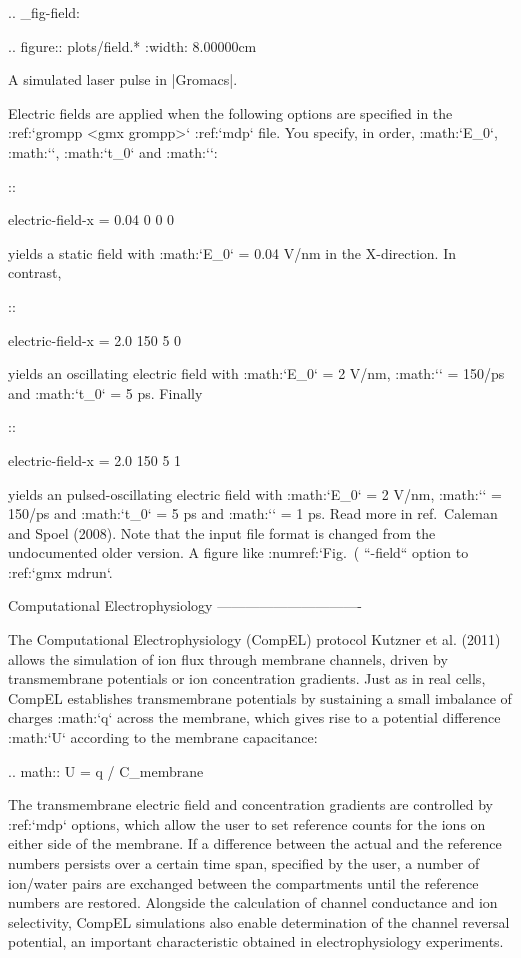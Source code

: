 .. _fig-field:

.. figure:: plots/field.*
   :width: 8.00000cm

   A simulated laser pulse in |Gromacs|.

Electric fields are applied when the following options are specified in
the :ref:`grompp <gmx grompp>` :ref:`mdp` file. You specify, in order, :math:`E_0`,
:math:`\omega`, :math:`t_0` and :math:`\sigma`:

::

    electric-field-x = 0.04 0       0     0

yields a static field with :math:`E_0` = 0.04 V/nm in the X-direction.
In contrast,

::

    electric-field-x = 2.0  150     5     0

yields an oscillating electric field with :math:`E_0` = 2 V/nm,
:math:`\omega` = 150/ps and :math:`t_0` = 5 ps. Finally

::

    electric-field-x = 2.0  150     5     1

yields an pulsed-oscillating electric field with :math:`E_0` = 2 V/nm,
:math:`\omega` = 150/ps and :math:`t_0` = 5 ps and :math:`\sigma` = 1
ps. Read more in ref. Caleman and Spoel (2008). Note that the input file
format is changed from the undocumented older version. A figure like
:numref:`Fig. (%
``-field`` option to :ref:`gmx mdrun`.

Computational Electrophysiology
-------------------------------

The Computational Electrophysiology (CompEL) protocol Kutzner et al.
(2011) allows the simulation of ion flux through membrane channels,
driven by transmembrane potentials or ion concentration gradients. Just
as in real cells, CompEL establishes transmembrane potentials by
sustaining a small imbalance of charges :math:`\Delta q` across the
membrane, which gives rise to a potential difference :math:`\Delta U`
according to the membrane capacitance:

.. math:: \Delta U = \Delta q / C_{membrane}

The transmembrane electric field and concentration gradients are
controlled by :ref:`mdp` options, which allow the user to set
reference counts for the ions on either side of the membrane. If a
difference between the actual and the reference numbers persists over a
certain time span, specified by the user, a number of ion/water pairs
are exchanged between the compartments until the reference numbers are
restored. Alongside the calculation of channel conductance and ion
selectivity, CompEL simulations also enable determination of the channel
reversal potential, an important characteristic obtained in
electrophysiology experiments.

